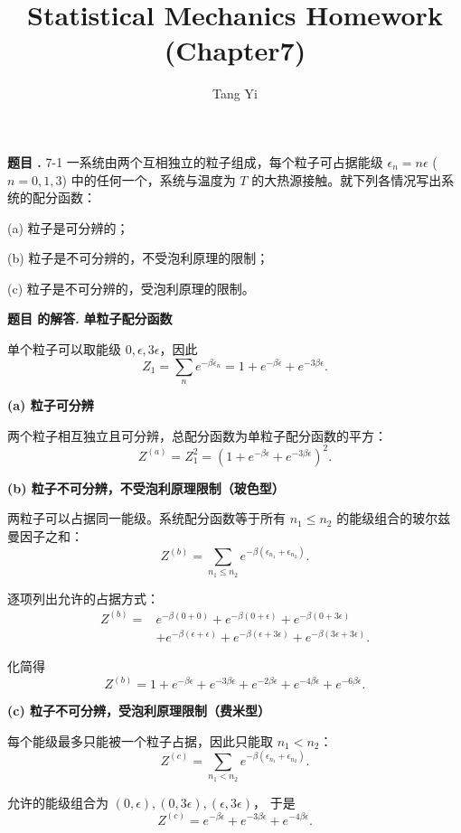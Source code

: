 \documentclass[12pt, a4paper, oneside]{ctexart}
\title{Statistical Mechanics Homework (Chapter7)}
\author{Tang Yi \\ [学号已脱敏]}
\newcounter{problemname}
\newenvironment{problem}
  {\begin{shaded}\stepcounter{problemname}\par\noindent\textbf{题目 \theproblemname. }}
  {\end{shaded}\par}
\newenvironment{solution}
  {\par\noindent\textbf{题目 \theproblemname 的解答. }}
  {\par}
\begin{document}
\maketitle

\begin{problem}{7-1}
  一系统由两个互相独立的粒子组成，每个粒子可占据能级 $\epsilon_n = n\epsilon$ ($n = 0, 1, 3$) 中的任何一个，系统与温度为 $T$ 的大热源接触。就下列各情况写出系统的配分函数：

(a) 粒子是可分辨的；

(b) 粒子是不可分辨的，不受泡利原理的限制；

(c) 粒子是不可分辨的，受泡利原理的限制。
\end{problem}

\begin{solution}
  \textbf{单粒子配分函数}

单个粒子可以取能级 $0,\epsilon,3\epsilon$，因此
\[
Z_1=\sum_{n} e^{-\beta \epsilon_n}
=1+e^{-\beta\epsilon}+e^{-3\beta\epsilon}.
\]

\textbf{(a) 粒子可分辨}

两个粒子相互独立且可分辨，总配分函数为单粒子配分函数的平方：
\[
Z^{(a)} = Z_1^2
= \left(1+e^{-\beta\epsilon}+e^{-3\beta\epsilon}\right)^2.
\]

\textbf{(b) 粒子不可分辨，不受泡利原理限制（玻色型）}

两粒子可以占据同一能级。系统配分函数等于所有
$n_1\le n_2$ 的能级组合的玻尔兹曼因子之和：
\[
Z^{(b)}=\sum_{n_1\le n_2} e^{-\beta(\epsilon_{n_1}+\epsilon_{n_2})}.
\]

逐项列出允许的占据方式：
\[
\begin{aligned}
Z^{(b)}={}&
e^{-\beta(0+0)}
+e^{-\beta(0+\epsilon)}
+e^{-\beta(0+3\epsilon)} \\
&+e^{-\beta(\epsilon+\epsilon)}
+e^{-\beta(\epsilon+3\epsilon)}
+e^{-\beta(3\epsilon+3\epsilon)} .
\end{aligned}
\]

化简得
\[
Z^{(b)}=
1+e^{-\beta\epsilon}
+e^{-3\beta\epsilon}
+e^{-2\beta\epsilon}
+e^{-4\beta\epsilon}
+e^{-6\beta\epsilon}.
\]

\textbf{(c) 粒子不可分辨，受泡利原理限制（费米型）}

每个能级最多只能被一个粒子占据，因此只能取
$n_1<n_2$：
\[
Z^{(c)}=\sum_{n_1<n_2} e^{-\beta(\epsilon_{n_1}+\epsilon_{n_2})}.
\]

允许的能级组合为 $(0,\epsilon),(0,3\epsilon),(\epsilon,3\epsilon)$，
于是
\[
Z^{(c)}=
e^{-\beta\epsilon}
+e^{-3\beta\epsilon}
+e^{-4\beta\epsilon}.
\]
\end{solution}
\end{document}
